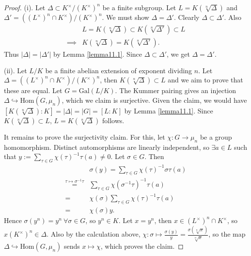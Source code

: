 \documentclass{article}
\theoremstyle{definition}
\begin{document}
\begin{proof}
    (i). Let $\Delta \subset K^\times/(K^\times)^n$ be a finite subgroup. Let $L = K(\sqrt[n]{\Delta})$ and $\Delta' = ((L^\times)^n \cap K^\times)/(K^\times)^n$. We must show $\Delta= \Delta'$. Clearly $\Delta \subset \Delta'$. Also 
    \begin{align*}
        &L = K(\sqrt[n]{\Delta}) \subset K(\sqrt[n]{\Delta'}) \subset L\\
        \implies & K(\sqrt[n]{\Delta}) = K(\sqrt[n]{\Delta'}).
    \end{align*}
    Thus $\left|\Delta\right|=\left|\Delta'\right|$ by Lemma \ref{lemma11.1}. Since $\Delta \subset \Delta'$, we get $\Delta= \Delta'$.
    \vspace{1mm}
     
    (ii). Let $L/K$ be a finite abelian extension of exponent dividing $n$. Let $\Delta=((L^\times)^n\cap K^\times)/(K^\times)^n$, then $K(\sqrt[n]{\Delta})\subset L$ and we aim to prove that these are equal. Let $G = \text{Gal}(L/K)$. The Kummer pairing gives an injection $\Delta \hookrightarrow \text{Hom}(G,\mu_n)$, which we claim is surjective. Given the claim, we would have $[K(\sqrt[n]{\Delta}):K] = \left|\Delta\right|=\left|G\right| = [L:K]$ by Lemma \ref{lemma11.1}. Since $K(\sqrt[n]{\Delta})\subset L$, $L=K(\sqrt[n]{\Delta})$ follows.
    \vspace{1mm}
     
    It remains to prove the surjectivity claim. For this, let $\chi : G \to \mu_n$ be a group homomorphism. Distinct automorphisms are linearly independent, so $\exists a \in L$ such that $y := \sum_{\tau \in G}^{} \chi(\tau)^{-1} \tau(a) \neq 0$. Let $\sigma \in G$. Then 
    \begin{align*}
        &\sigma(y) = \sum_{\tau \in G}^{} \chi(\tau)^{-1}\sigma \tau(a) \\
        \stackrel{\tau \mapsto \sigma^{-1}\tau}{=}& \sum_{\tau \in G}^{} \chi(\sigma^{-1} \tau)^{-1}\tau(a)\\
        =&\chi(\sigma)\sum_{\tau \in G}^{} \chi(\tau)^{-1}\tau(a)\\
        =&\chi(\sigma)y.
    \end{align*}
    Hence $\sigma(y^n)=y^n ~\forall \sigma \in G$, so $y^n \in K$. Let $x = y^n$, then $x \in (L^\times)^{n} \cap K^\times$, so $x(K^{\times})^n \in \Delta$. Also by the calculation above, $\chi : \sigma \mapsto \frac{\sigma(y)}{y} = \frac{\sigma(\sqrt[n]{x})}{\sqrt[n]{x}}$, so the map $\Delta \hookrightarrow \text{Hom}(G,\mu_n)$ sends $x \mapsto \chi$, which proves the claim.
\end{proof}
\end{document}
